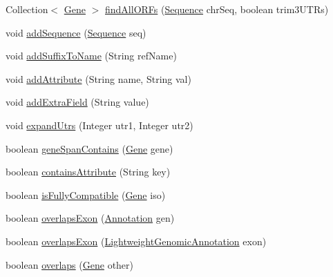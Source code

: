 \begin{DoxyCompactItemize}
\item 
Collection$<$ \hyperlink{classumms_1_1core_1_1annotation_1_1_gene}{Gene} $>$ \hyperlink{classumms_1_1core_1_1annotation_1_1_gene_ac75924ad96922b01c085759027ee5785}{find\+All\+O\+R\+Fs} (\hyperlink{classbroad_1_1core_1_1sequence_1_1_sequence}{Sequence} chr\+Seq, boolean trim3\+U\+T\+Rs)
\item 
void \hyperlink{classumms_1_1core_1_1annotation_1_1_gene_adc178f2df2e3335f2be2ca1302029fa1}{add\+Sequence} (\hyperlink{classbroad_1_1core_1_1sequence_1_1_sequence}{Sequence} seq)
\item 
void \hyperlink{classumms_1_1core_1_1annotation_1_1_gene_a93541e4d3cd4a5a6421fa773335af61a}{add\+Suffix\+To\+Name} (String ref\+Name)
\item 
void \hyperlink{classumms_1_1core_1_1annotation_1_1_gene_a32285efc91cf889c422c0df464a3957f}{add\+Attribute} (String name, String val)
\item 
void \hyperlink{classumms_1_1core_1_1annotation_1_1_gene_af453029e25244ea677fd8b05db926150}{add\+Extra\+Field} (String value)
\item 
void \hyperlink{classumms_1_1core_1_1annotation_1_1_gene_a6343872d27f12dba6fdb801e361884d6}{expand\+Utrs} (Integer utr1, Integer utr2)
\item 
boolean \hyperlink{classumms_1_1core_1_1annotation_1_1_gene_a218a0602d404d12635adef7d0830c131}{gene\+Span\+Contains} (\hyperlink{classumms_1_1core_1_1annotation_1_1_gene}{Gene} gene)
\item 
boolean \hyperlink{classumms_1_1core_1_1annotation_1_1_gene_a872db95b096377da9d316bd91a2275e8}{contains\+Attribute} (String key)
\item 
boolean \hyperlink{classumms_1_1core_1_1annotation_1_1_gene_ac1f84639046dcf50ab5c6ff82416cfaa}{is\+Fully\+Compatible} (\hyperlink{classumms_1_1core_1_1annotation_1_1_gene}{Gene} iso)
\item 
boolean \hyperlink{classumms_1_1core_1_1annotation_1_1_gene_acbad6a7b7966ae5dbcbbfc8ac661ec48}{overlaps\+Exon} (\hyperlink{interfaceumms_1_1core_1_1annotation_1_1_annotation}{Annotation} gen)
\item 
boolean \hyperlink{classumms_1_1core_1_1annotation_1_1_gene_aacfceb2b005dc24a538080c50f7fd8d1}{overlaps\+Exon} (\hyperlink{interfacebroad_1_1core_1_1annotation_1_1_lightweight_genomic_annotation}{Lightweight\+Genomic\+Annotation} exon)
\item 
boolean \hyperlink{classumms_1_1core_1_1annotation_1_1_gene_a98b9f6a6b7e79850aef92469d0c15a58}{overlaps} (\hyperlink{classumms_1_1core_1_1annotation_1_1_gene}{Gene} other)

\end{DoxyCompactItemize}
